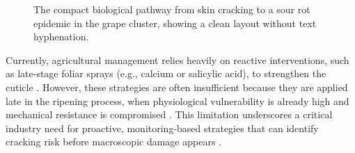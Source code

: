 \begin{figure}[hbt!]
    \centering
    \caption[Sour rot progression pathway]{The compact biological pathway from skin cracking to a sour rot epidemic in the grape cluster, showing a clean layout without text hyphenation.}
    \label{fig:sour_rot_cascade_compact_fixed}
\end{figure}


\medskip
\noindent
Currently, agricultural management relies heavily on reactive interventions, such as late-stage foliar sprays (e.g., calcium or salicylic acid), to strengthen the cuticle \parencite{plants13172400, app112311374}. However, these strategies are often insufficient because they are applied late in the ripening process, when physiological vulnerability is already high and mechanical resistance is compromised \parencite{Chang2019, Chang2021, YU20251506}. This limitation underscores a critical industry need for proactive, monitoring-based strategies that can identify cracking risk before macroscopic damage appears \parencite{CrackSense2022}.

